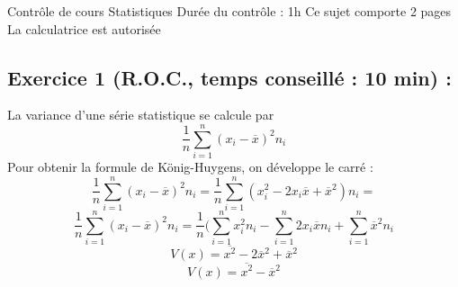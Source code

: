 

\usepackage[c]{esvect}
\newcommand{\covec}[2]{\begin{pmatrix}#1 \\#2 \end{pmatrix}}


\center
\Large Contrôle de cours
\flushleft
\center
Statistiques
\flushleft \normalsize
Durée du contrôle : 1h\newline
Ce sujet comporte 2 pages\newline
La calculatrice est autorisée
\subsection*{Exercice 1 (R.O.C., temps conseillé : 10 min) : }
La variance d'une série statistique se calcule par 
$$\frac{1}{n}\sum_{i=1}^n (x_i - \overline{x})^2 n_i$$
Pour obtenir la formule de König-Huygens, on développe le carré : 
$$\frac{1}{n}\sum_{i=1}^n (x_i - \overline{x})^2 n_i =\frac{1}{n}\sum_{i=1}^n (x_i^2 -2x_i\overline{x} + \overline{x}^2) n_i = $$
$$\frac{1}{n}\sum_{i=1}^n (x_i - \overline{x})^2 n_i =\frac{1}{n}(\sum_{i=1}^n x_i^2n_i -\sum_{i=1}^n 2x_i\overline{x}n_i + \sum_{i=1}^n\overline{x}^2 n_i$$
$$V(x) =\overline{x^2} -2\overline{x}^2 + \overline{x}^2$$
$$V(x) =\overline{x^2} -\overline{x}^2$$
